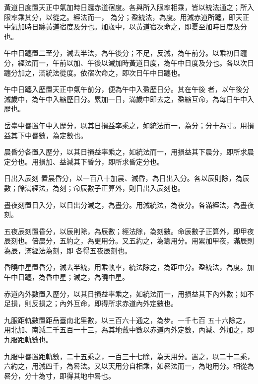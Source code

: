 \begin{pinyinscope}
 黃道日度置天正中氣加時日躔赤道宿度。各與所入限率相乘，皆以統法通之；所入限率乘其分，以從之。經法而一，
 為分；盈統法，為度。用減赤道所躔，即天正中氣加時日躔黃道宿度及分也。加歲中，以黃道宿次命之，即夏至加時日度及分也。



 午中日躔置二至分，減去半法，為午後分；不足，反減，為午前分。以乘初日躔分，經法而一，午前以加、午後以減加時黃道日度，為午中日度及分也。各以次日躔分加之，滿統法從度。依宿次命之，即次日午中日躔也。



 午中日躔入歷置天正中氣午前分，便為午中入盈歷日分。其在午後
 者，以午後分減歲中，為午中入縮歷日分。累加一日，滿歲中即去之，盈縮互命，為每日午中入歷也。



 岳臺中晷置午中入歷分，以其日損益率乘之，如統法而一，為分；分十為寸。用損益其下中晷數，為定數也。



 晨昏分各置入歷分，以其日損益率乘之，如統法而一，用損益其下晨分，即所求晨定分也。用損加、益減其下昏分，即所求昏定分也。



 日出入辰刻
 置晨昏分，以一百八十加晨、減昏，為日出入分。各以辰則除，為辰數；餘滿經法，為刻；命辰數子正算外，則日出入辰刻也。



 晝夜刻置日入分，以日出分減之，為晝分。用減統法，為夜分。各滿經法，為晝夜刻。



 五夜辰刻置昏分，以辰則除，為辰數；經法除，為刻數。命辰數子正算外，即甲夜辰刻也。倍晨分，五約之，為更用分。又五約之，為籌用分。用累加甲夜，滿辰則為辰，滿經法為刻，即
 各得五夜辰刻也。



 昏曉中星置昏分，減去半統，用乘軌率，統法除之，為距中分。盈統法，為度。加午中日躔，為昏中星；減之，為曉中星。



 赤道內外數置入歷分，以其日損益率乘之，如統法而一，用損益其下內外數；如不足損，則反損之；內外互命，即得所求赤道內外定數也。



 九服距軌數置距岳臺南北里數，以三百六十通之，為步。一千七百
 五十六除之，用北加、南減二千五百一十三，為其地戴中數以赤道內外定數，內減、外加之，即九服距軌數也。



 九服中晷置距軌數，二十五乘之，一百三十七除，為天用分。置之，以二十二乘，六約之，用減四千，為晷法。又以天用分自相乘，如晷法而一，為地用分。相從為晷分，分十為寸，即得其地中晷也。




\end{pinyinscope}
